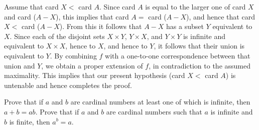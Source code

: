 Assume that card $X <$ card $A$. Since card $A$ is equal to the larger one of card $X$ and card ($A - X$), this implies that card $A =$ card ($A - X$), and hence that card $X <$ card ($A - X$). From this it follows that $A - X$ has a subset $Y$ equivalent to $X$. Since each of the disjoint sets $X \times Y$, $Y \times X$, and $Y \times Y$ is infinite and equivalent to $X \times X$, hence to $X$, and hence to $Y$, it follows that their union is equivalent to $Y$. By combining $f$ with a one-to-one correspondence between that union and $Y$, we obtain a proper extension of $f$, in contradiction to the assumed maximality. This implies that our present hypothesis (card $X <$ card $A$) is untenable and hence completes the proof. 

\begin{exercise} Prove that if $a$ and $b$ are cardinal numbers at least one of which is infinite, then $a + b = ab$. Prove that if $a$ and $b$ are cardinal numbers such that $a$ is infinite and $b$ is finite, then $a^{b} = a$.
\end{exercise}